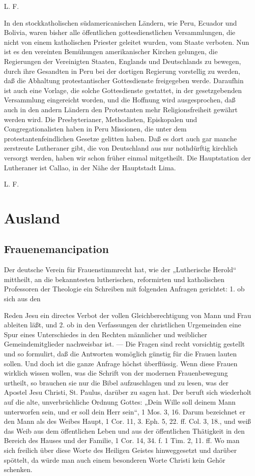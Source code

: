L. F.

In den stockkatholischen südamericanischen Ländern, wie Peru, Ecuador und Bolivia, waren bisher alle öffentlichen gottesdienstlichen Versammlungen, die nicht von einem katholischen Priester geleitet wurden, vom Staate verboten. Nun ist es den vereinten Bemühungen amerikanischer Kirchen gelungen, die Regierungen der Vereinigten Staaten, Englands und Deutschlands zu bewegen, durch ihre Gesandten in Peru bei der dortigen Regierung vorstellig zu werden, daß die Abhaltung protestantischer Gottesdienste freigegeben werde. Daraufhin ist auch eine Vorlage, die solche Gottesdienste gestattet, in der gesetzgebenden Versammlung eingereicht worden, und die Hoffnung wird ausgesprochen, daß auch in den andern Ländern den Protestanten mehr Religionsfreiheit gewährt werden wird. Die Presbyterianer, Methodisten, Episkopalen und Congregationalisten haben in Peru Missionen, die unter dem protestantenfeindlichen Gesetze gelitten haben. Daß es dort auch gar manche zerstreute Lutheraner gibt, die von Deutschland aus nur nothdürftig kirchlich versorgt werden, haben wir schon früher einmal mitgetheilt. Die Hauptstation der Lutheraner ist Callao, in der Nähe der Hauptstadt Lima.

L. F.

\section{Ausland}

\subsection{Frauenemancipation}

Der deutsche Verein für Frauenstimmrecht hat, wie der „Lutherische Herold“ mittheilt, an die bekanntesten lutherischen, reformirten und katholischen Professoren der Theologie ein Schreiben mit folgenden Anfragen gerichtet: 1. ob sich aus den

Reden Jesu ein directes Verbot der vollen Gleichberechtigung von Mann und Frau ableiten läßt, und 2. ob in den Verfassungen der christlichen Urgemeinden eine Spur eines Unterschiedes in den Rechten männlicher und weiblicher Gemeindemitglieder nachweisbar ist. — Die Fragen sind recht vorsichtig gestellt und so formulirt, daß die Antworten womöglich günstig für die Frauen lauten sollen. Und doch ist die ganze Anfrage höchst überflüssig. Wenn diese Frauen wirklich wissen wollen, was die Schrift von der modernen Frauenbewegung urtheilt, so brauchen sie nur die Bibel aufzuschlagen und zu lesen, was der Apostel Jesu Christi, St. Paulus, darüber zu sagen hat. Der beruft sich wiederholt auf die alte, unverbrüchliche Ordnung Gottes: „Dein Wille soll deinem Mann unterworfen sein, und er soll dein Herr sein“, 1 Mos. 3, 16. Darum bezeichnet er den Mann als des Weibes Haupt, 1 Cor. 11, 3. Eph. 5, 22. ff. Col. 3, 18., und weiß das Weib aus dem öffentlichen Leben und aus der öffentlichen Thätigkeit in den Bereich des Hauses und der Familie, 1 Cor. 14, 34. f. 1 Tim. 2, 11. ff. Wo man sich freilich über diese Worte des Heiligen Geistes hinweggesetzt und darüber spöttelt, da würde man auch einem besonderen Worte Christi kein Gehör schenken.

